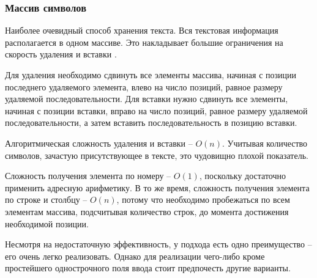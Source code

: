 \documentclass{fefu}
\begin{document}
			\subsubsection{Массив символов}
				\par Наиболее очевидный способ хранения текста. Вся текстовая информация
				располагается в одном массиве. Это накладывает большие ограничения на скорость
				удаления и вставки \cite{StringsReference}. 
				\par Для удаления необходимо сдвинуть все элементы массива, начиная с позиции
				последнего удаляемого элемента, влево на число позиций, равное размеру
				удаляемой последовательности. Для вставки нужно сдвинуть все элементы, начиная
				с позиции вставки, вправо на число позиций, равное размеру удаляемой
				последовательности, а затем вставить последовательность в позицию вставки.
				\par Алгоритмическая сложность удаления и вставки -- $O(n)$. Учитывая 
				количество символов, зачастую присутствующее в тексте, это чудовищно плохой 
				показатель.
				\par Сложность получения элемента по номеру -- $O(1)$, поскольку достаточно
				применить адресную арифметику. В то же время, сложность получения элемента по
				строке и столбцу -- $O(n)$, потому что необходимо пробежаться по всем элементам
				массива, подсчитывая количество строк, до момента достижения необходимой
				позиции.
				\par Несмотря на недостаточную эффективность, у подхода есть одно преимущество
				-- его очень легко реализовать. Однако для реализации чего-либо кроме
				простейшего однострочного поля ввода стоит предпочесть другие варианты.
\end{document}
